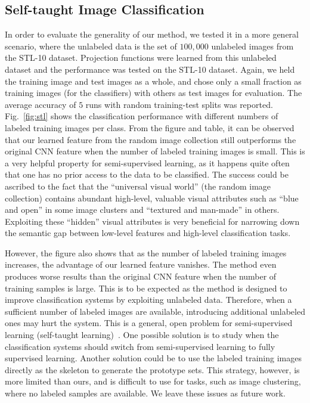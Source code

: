 \subsection{Self-taught Image Classification}
\label{sec:self}
In order to evaluate the generality of our method, we tested it in a
more general scenario, where the unlabeled data is the set of
$100,000$ unlabeled images from the STL-10 dataset. Projection
functions were learned from this unlabeled dataset and the performance
was tested on the STL-10 dataset. Again, we held the training image
and test images as a whole, and chose only a small fraction as
training images (for the classifiers) with others as test images for
evaluation.  The average accuracy of $5$ runs with random
training-test splits was reported.  Fig.~\ref{fig:stl} shows the
classification performance with different numbers of labeled training
images per class.  From the figure and table, it can be observed that our
learned feature from the random image collection still outperforms the
original CNN feature when the number of labeled training images is
small.
This is a very helpful property for semi-supervised learning,
as it happens quite often that one has no prior access to the data to
be classified. The success could be ascribed to the fact that the
``universal visual world'' (the random image collection) contains
abundant high-level, valuable visual attributes such as ``blue and
open'' in some image clusters and ``textured and man-made'' in
others. Exploiting these ``hidden'' visual attributes is very
beneficial for narrowing down the semantic gap between low-level
features and high-level classification tasks.

However, the figure also shows that as the number of labeled training
images increases, the advantage of our learned feature vanishes. The
method even produces worse results than the original CNN feature when
the number of training samples is large.  This is to be expected as
the method is designed to improve classification systems by exploiting
unlabeled data. Therefore, when a sufficient
number of labeled images are available, introducing additional
unlabeled ones may hurt the system.  This is a general, open problem
for semi-supervised learning (self-taught
learning)~\citep{neverhurt:icml11}. One possible solution is to study
when the classification systems should switch from semi-supervised
learning to fully supervised learning. Another solution could be to
use the labeled training images directly as the skeleton to generate
the prototype sets. This strategy, however, is more limited than
ours, and is difficult to use for tasks, such as image
clustering, where no labeled samples are
available. We leave these issues as future work. 

